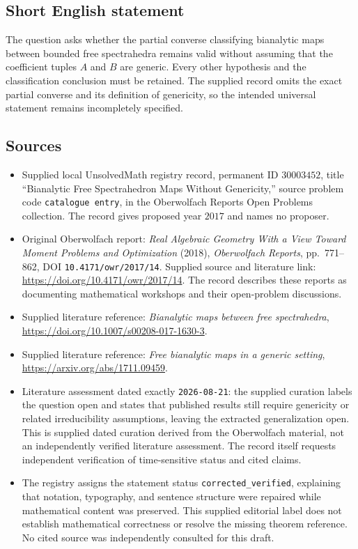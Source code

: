 \documentclass[11pt]{article}
\begin{document}
\subsection{Short English statement}
The question asks whether the partial converse classifying bianalytic maps between bounded free spectrahedra remains valid without assuming that the coefficient tuples \(A\) and \(B\) are generic. Every other hypothesis and the classification conclusion must be retained. The supplied record omits the exact partial converse and its definition of genericity, so the intended universal statement remains incompletely specified.
\subsection{Sources}
\begin{itemize}
\item Supplied local UnsolvedMath registry record, permanent ID \(30003452\), title ``Bianalytic Free Spectrahedron Maps Without Genericity,'' source problem code \texttt{catalogue entry}, in the Oberwolfach Reports Open Problems collection. The record gives proposed year \(2017\) and names no proposer.
\item Original Oberwolfach report: \emph{Real Algebraic Geometry With a View Toward Moment Problems and Optimization} (2018), \emph{Oberwolfach Reports}, pp.\ 771--862, DOI \texttt{10.4171/owr/2017/14}. Supplied source and literature link: \url{https://doi.org/10.4171/owr/2017/14}. The record describes these reports as documenting mathematical workshops and their open-problem discussions.
\item Supplied literature reference: \emph{Bianalytic maps between free spectrahedra}, \url{https://doi.org/10.1007/s00208-017-1630-3}.
\item Supplied literature reference: \emph{Free bianalytic maps in a generic setting}, \url{https://arxiv.org/abs/1711.09459}.
\item Literature assessment dated exactly \texttt{2026-08-21}: the supplied curation labels the question open and states that published results still require genericity or related irreducibility assumptions, leaving the extracted generalization open. This is supplied dated curation derived from the Oberwolfach material, not an independently verified literature assessment. The record itself requests independent verification of time-sensitive status and cited claims.
\item The registry assigns the statement status \texttt{corrected\_verified}, explaining that notation, typography, and sentence structure were repaired while mathematical content was preserved. This supplied editorial label does not establish mathematical correctness or resolve the missing theorem reference. No cited source was independently consulted for this draft.
\end{itemize}
\end{document}
